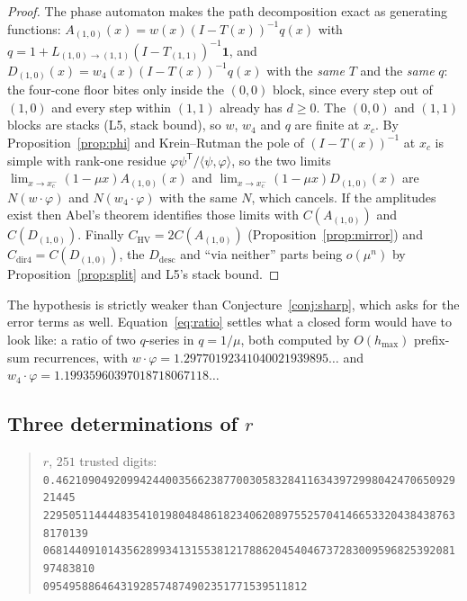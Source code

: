 \documentclass[11pt]{article}
\newcommand{\HV}{\mathrm{HV}}
\begin{document}
\begin{proof}
The phase automaton makes the path decomposition exact as generating functions:
$A_{(1,0)}(x) = w(x)(I-T(x))^{-1}q(x)$ with
$q = 1 + L_{(1,0)\to(1,1)}(I-T_{(1,1)})^{-1}\mathbf 1$, and
$D_{(1,0)}(x) = w_4(x)(I-T(x))^{-1}q(x)$ with the \emph{same} $T$ and the
\emph{same} $q$: the four-cone floor bites only inside the $(0,0)$ block,
since every step out of $(1,0)$ and every step within $(1,1)$ already has
$d \ge 0$. The $(0,0)$ and $(1,1)$ blocks are stacks
(L5, stack bound), so $w$, $w_4$ and $q$ are finite at $x_c$. By
Proposition~\ref{prop:phi} and Krein--Rutman the pole of $(I-T(x))^{-1}$ at
$x_c$ is simple with rank-one residue $\varphi\psi^{\mathsf T}/\langle\psi,
\varphi\rangle$, so the two limits
$\lim_{x\to x_c^-}(1-\mu x)A_{(1,0)}(x)$ and
$\lim_{x\to x_c^-}(1-\mu x)D_{(1,0)}(x)$ are $N(w\cdot\varphi)$ and
$N(w_4\cdot\varphi)$ with the same $N$, which cancels. If the amplitudes exist
then Abel's theorem identifies those limits with $C(A_{(1,0)})$ and
$C(D_{(1,0)})$. Finally $C_{\HV} = 2C(A_{(1,0)})$
(Proposition~\ref{prop:mirror}) and $C_{\text{dir4}} = C(D_{(1,0)})$, the
$D_{\mathrm{desc}}$ and ``via neither'' parts being $o(\mu^n)$ by
Proposition~\ref{prop:split} and L5's stack bound.
\end{proof}

The hypothesis is strictly weaker than Conjecture~\ref{conj:sharp}, which asks
for the error terms as well. Equation~\eqref{eq:ratio} settles what a closed form would have to look like: a ratio of two $q$-series in $q = 1/\mu$, both computed
by $O(h_{\max})$ prefix-sum recurrences, with
$w\cdot\varphi = 1.29770192341040021939895\dots$ and
$w_4\cdot\varphi = 1.19935960397018718067118\dots$

\subsection{Three determinations of \texorpdfstring{$r$}{r}}

\begin{quote}\small
$r$, $251$ trusted digits:\\[2pt]
\texttt{0.4621090492099424400356623877003058328411634397299804247065092921445}\\
\texttt{22950511444483541019804848618234062089755257041466533204384387638170139}\\
\texttt{068144091014356289934131553812178862045404673728300959682539208197483810}\\
\texttt{09549588646431928574874902351771539511812}
\end{quote}
\end{document}
